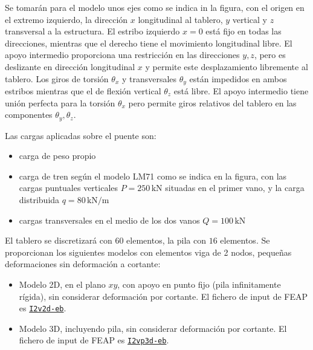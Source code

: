 \documentclass[a4paper,12pt]{article}
\begin{document}
Se tomarán para el modelo unos ejes como se indica in la figura, con el origen en el extremo izquierdo, la dirección $x$ longitudinal al tablero, $y$ vertical y $z$ transversal a la estructura. 
El estribo izquierdo $x=0$ está fijo en todas las direcciones, mientras que el derecho tiene el movimiento longitudinal libre. El apoyo intermedio proporciona una restricción en las direcciones $y,z$, pero es deslizante en dirección longitudinal $x$ y permite este desplazamiento libremente al tablero. Los giros de torsión $\theta_{x}$ y transversales $\theta_{y}$ están impedidos en ambos estribos mientras que el de flexión vertical $\theta_{z}$ está libre.
El apoyo intermedio tiene unión perfecta para la torsión $\theta_{x}$ pero permite giros relativos del tablero en las componentes $\theta_{y}, \theta_{z}$.

Las cargas aplicadas sobre el puente son:
\begin{itemize}
 \item carga de peso propio
 \item carga de tren según el modelo LM71 como se indica en la figura, con las cargas puntuales verticales $P=250\,\text{kN}$ situadas en el primer vano, y la carga distribuida $q=80\,\text{kN/m}$ 
 \item cargas transversales en el medio de los dos vanos $Q=100\,\text{kN}$
\end{itemize}

El tablero se discretizará con $60$ elementos, la pila con $16$ elementos. Se proporcionan los siguientes modelos con elementos viga de 2 nodos, pequeñas deformaciones sin deformación a cortante:
\begin{itemize}
	\item Modelo 2D, en el plano $xy$, con apoyo en punto fijo (pila infinitamente rígida), sin considerar deformación por cortante. El fichero de input de FEAP es \href{http://stokes.mecanica.upm.es/MEFL_open/talleres/I2v2d-eb}{\texttt{I2v2d-eb}}.
	\item Modelo 3D, incluyendo pila, sin considerar deformación por cortante. El fichero de input de FEAP es \href{http://stokes.mecanica.upm.es/MEFL_open/talleres/I2vp3d-eb}{\texttt{I2vp3d-eb}}.

\end{itemize}
\end{document}
